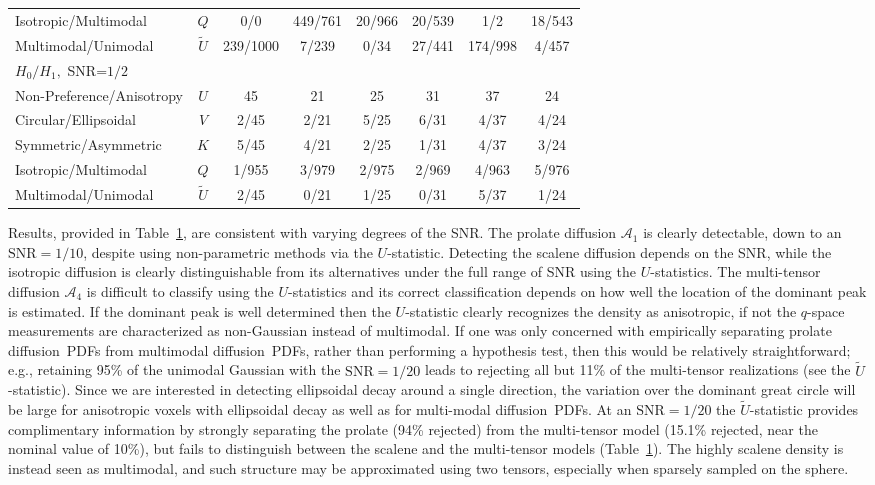 \documentclass[dvips,aoas,preprint]{imsart}
\numberwithin{equation}{section}
\theoremstyle{plain}
\newcommand{\cA}{\mathcal{A}}
\newcommand{\wt}[1]{\widetilde{#1}}
\begin{document}
\begin{table}[!htbp]
\begin{tabular}{lccccccc}
      Isotropic/Multimodal& $Q$ & 0/0 & 449/761 & 20/966  & 20/539&1/2  &18/543 \\ 
      Multimodal/Unimodal & $\wt{U}$ & 239/1000 & 7/239 & 0/34 & 27/441 & 174/998  & 4/457\\
      \hline
$H_0/H_1,$ SNR=$1/2$ & & & & & & & \\
\hline
      Non-Preference/Anisotropy & $U$ & 45 & 21 & 25 & 31 & 37 & 24\\ 
Circular/Ellipsoidal & $V$ & 2/45 & 2/21 & 5/25 & 6/31 & 4/37 & 4/24\\
        Symmetric/Asymmetric & $K$ & 5/45 & 4/21 & 2/25 & 1/31 & 4/37 & 3/24\\ 
      Isotropic/Multimodal& $Q$ & 1/955 & 3/979 & 2/975  &2/969& 4/963 &5/976 \\ 
      Multimodal/Unimodal & $\wt{U}$ & 2/45 & 0/21 & 1/25 &0/31  & 5/37  & 1/24\\
      \hline
      \hline
    \end{tabular}
  \label{testing}
\end{table}

Results, provided in Table~\ref{testing}, are consistent with varying
degrees of the SNR.  The prolate diffusion $\cA_1$ is clearly
detectable, down to an $\text{SNR}=1/10$, despite using non-parametric
methods via the $U$-statistic.  Detecting the scalene diffusion
depends on the SNR, while the isotropic diffusion is clearly
distinguishable from its alternatives under the full range of SNR
using the $U$-statistics.  The multi-tensor diffusion $\cA_4$ is
difficult to classify using the $U$-statistics and its correct
classification depends on how well the location of the dominant peak
is estimated.  If the dominant peak is well determined then the
$U$-statistic clearly recognizes the density as anisotropic, if not
the $q$-space measurements are characterized as non-Gaussian instead
of multimodal.  If one was only concerned with empirically separating
prolate diffusion~PDFs from multimodal diffusion~PDFs, rather than
performing a hypothesis test, then this would be relatively
straightforward; e.g., retaining 95\% of the unimodal Gaussian with
the $\text{SNR}=1/20$ leads to rejecting all but 11\% of the
multi-tensor realizations (see the $\tilde{U}$-statistic).  Since we
are interested in detecting ellipsoidal decay around a single
direction, the variation over the dominant great circle will be large
for anisotropic voxels with ellipsoidal decay as well as for
multi-modal diffusion~PDFs.  At an $\text{SNR}=1/20$ the
$\wt{U}$-statistic provides complimentary information by strongly
separating the prolate (94\% rejected) from the multi-tensor model
(15.1\% rejected, near the nominal value of 10\%), but fails to
distinguish between the scalene and the multi-tensor models
(Table~\ref{testing}).  The highly scalene density is instead seen as
multimodal, and such structure may be approximated using two tensors,
especially when sparsely sampled on the sphere.
\end{document}
